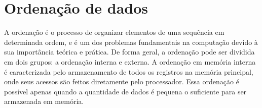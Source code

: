 \section{Ordenação de dados}


%
%
%
%
%
%

A ordenação é o processo de organizar elementos de uma sequência em determinada ordem, e é um dos problemas fundamentais na computação devido à sua importância teórica e prática. De forma geral, a ordenação pode ser dividida em dois grupos: a ordenação interna e externa. 
A ordenação em memória interna é caracterizada pelo armazenamento de todos os registros na memória principal, onde seus acessos são feitos diretamente pelo processador. Essa ordenação é possível apenas quando a quantidade de dados é pequena o suficiente para ser armazenada em memória. 

